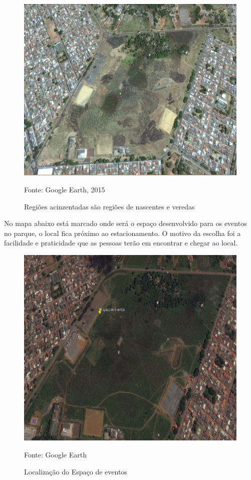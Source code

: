 \begin{figure}[H]
	 \centering
	\label{Regiões das nascentes e vederedas}
	 \includegraphics[keepaspectratio=true,scale=0.8]{figuras/RegioesDasNascentes.png}
	 \caption{Regiões acinzentadas são regiões de nascentes e veredas}
	 \small{Fonte: Google Earth, 2015}
\end{figure}

	No mapa abaixo está marcado onde será o espaço desenvolvido para os eventos no parque, o local fica próximo ao estacionamento. O motivo da escolha foi a facilidade e praticidade que as pessoas terão em encontrar e chegar ao local.

\begin{figure}[H]
	 \centering
	\label{Localização do espaço de eventos}
	 \includegraphics[keepaspectratio=true,scale=0.8]{figuras/LocalEspacoEvento.png}
	 \caption{Localização do Espaço de eventos}
	 \small{Fonte: Google Earth}
\end{figure}

